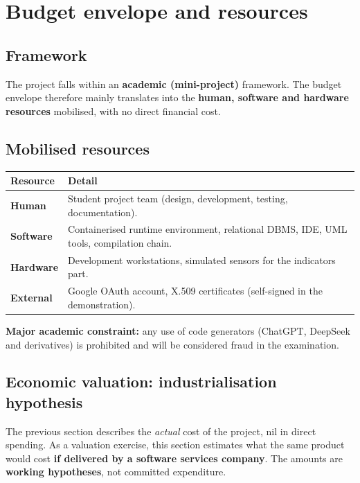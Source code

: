\chapter{Budget envelope and resources}

\section{Framework}
The project falls within an \textbf{academic (mini-project)} framework. The
budget envelope therefore mainly translates into the \textbf{human, software and
hardware resources} mobilised, with no direct financial cost.

\section{Mobilised resources}
\begin{xltabular}{\textwidth}{>{\bfseries}p{4cm} X}
\toprule
\textbf{Resource} & \textbf{Detail} \\
\midrule
\endhead
Human    & Student project team (design, development, testing, documentation). \\
Software & Containerised runtime environment, relational DBMS, IDE, UML tools, compilation chain. \\
Hardware & Development workstations, simulated sensors for the indicators part. \\
External & Google OAuth account, X.509 certificates (self-signed in the demonstration). \\
\bottomrule
\end{xltabular}

\begin{encadre}
\textbf{Major academic constraint:} any use of code generators (ChatGPT,
DeepSeek and derivatives) is prohibited and will be considered fraud in the
examination.
\end{encadre}

\section{Economic valuation: industrialisation hypothesis}
The previous section describes the \emph{actual} cost of the project, nil in
direct spending. As a valuation exercise, this section estimates what the same
product would cost \textbf{if delivered by a software services company}. The
amounts are \textbf{working hypotheses}, not committed expenditure.

